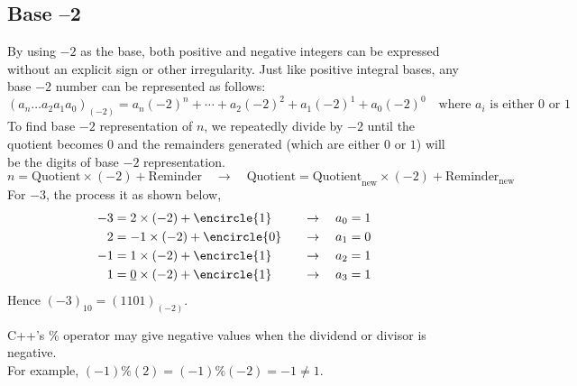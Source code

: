 \documentclass[../../Problems]{subfiles}
\begin{document}
\subsection{Base --2}
By using $-2$ as the base, both positive and negative integers can be expressed without an explicit sign or other irregularity. Just like positive integral bases, any base $-2$ number can be represented as follows:
\begin{equation}
(a_n\ldots a_2a_1a_0)_{(-2)} = a_n(-2)^n+\cdots+a_2(-2)^2+a_1(-2)^1+a_0(-2)^0 \quad\text{where $a_i$ is either $0$ or $1$}
\end{equation}
To find base $-2$ representation of $n$, we repeatedly divide by $-2$ until the quotient becomes $0$ and the remainders generated (which are either $0$ or $1$) will be the digits of base $-2$ representation.
\begin{equation*}
n = \text{Quotient}\times(-2) + \text{Reminder} \quad\rightarrow\quad \text{Quotient} = \text{Quotient}_{\text{new}}\times(-2) + \text{Reminder}_{\text{new}}
\end{equation*}
For $-3$, the process it as shown below,
\begin{equation*}
\begin{aligned}
-3&= 2\times(-2) + \encircle{1} &\quad\rightarrow\quad a_0 = 1\\
2&= -1\times(-2) + \encircle{0} &\quad\rightarrow\quad a_1 = 0\\
-1&= 1\times(-2) + \encircle{1} &\quad\rightarrow\quad a_2 = 1\\
1&= \underline{0}\times(-2) + \encircle{1} &\quad\rightarrow\quad a_3 = 1
\end{aligned}
\end{equation*}
Hence $(-3)_{10} = (1101)_{(-2)}$.
\begin{note}
C++'s \% operator may give negative values when the dividend or divisor is negative.\\
For example, $(-1)\%(2) = (-1)\%(-2) = -1 \neq 1$.
\end{note}
\end{document}
